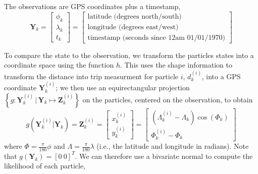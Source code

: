 \documentclass[14paper,twoside]{article}
\newcommand{\bY}{\mathbf{Y}}
\newcommand{\bZ}{\mathbf{Z}}
\newcommand{\g}[1]{g\left(#1\right)}
\begin{document}
The observations are GPS coordinates plus a timestamp,
\begin{equation}
  \label{eq:vehicle_observation}
  \bY_k =
  \begin{bmatrix}
    \phi_k \\ \lambda_k \\ t_k
  \end{bmatrix} =
  \left[
    \begin{array}{l}
      \text{latitude (degrees north/south)} \\
      \text{longitude (degrees east/west)} \\
      \text{timestamp (seconds since 12am 01/01/1970)}
    \end{array}
  \right]
\end{equation}


To compare the state to the observation, 
we transform the particles states into a coordinate space using the function $h$.
This uses the shape information to transform the distance into trip measurment for particle $i$, $d_k^{(i)}$,
into a GPS coordinate $\bY_k^{(i)}$;
we then use an equirectangular projection 
$\left\{g : \bY_k^{(i)} \,|\, \bY_k \mapsto \bZ_k^{(i)} \right\}$ 
on the particles, centered on the observation, to obtain 
\begin{equation}
  \label{eq:transform}
  \g{\bY_k^{(i)} | \bY_k} = \bZ_k^{(i)} =
  \begin{bmatrix}
    x_k^{(i)} \\ y_k^{(i)}
  \end{bmatrix} =
  \begin{bmatrix}
    \left( \Lambda_k^{(i)} - \Lambda_k \right) \cos \left( \Phi_k \right) \\
    \Phi_k^{(i)} - \Phi_k
  \end{bmatrix}
\end{equation}
where $\Phi = \frac{\pi}{180} \phi$ and $\Lambda = \frac{\pi}{180} \lambda$ 
(i.e., the latitude and longitude in radians).
Note that $g(\bY_k) = \left[0\ 0\right]^T$.
We can therefore use a bivariate normal to compute the likelihood of each particle,
\end{document}
